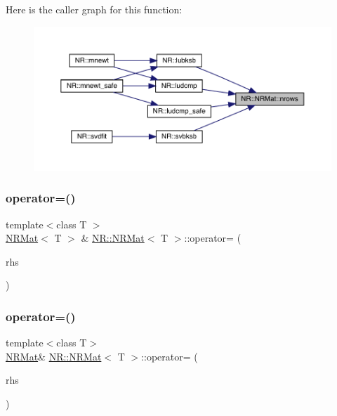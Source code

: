 Here is the caller graph for this function\+:
\nopagebreak
\begin{figure}[H]
\begin{center}
\leavevmode
\includegraphics[width=350pt]{da/d92/classNR_1_1NRMat_aacebd802ca3dea0e0079a8dd27f7102c_icgraph}
\end{center}
\end{figure}
\mbox{\label{classNR_1_1NRMat_a3cb82862ba2a5cff2516bd1c7ff517ef}} 
\subsubsection{\texorpdfstring{operator=()}{operator=()}\hspace{0.1cm}{\footnotesize\ttfamily [1/6]}}
{\footnotesize\ttfamily template$<$class T $>$ \\
\mbox{\hyperlink{classNR_1_1NRMat}{N\+R\+Mat}}$<$ T $>$ \& \mbox{\hyperlink{classNR_1_1NRMat}{N\+R\+::\+N\+R\+Mat}}$<$ T $>$\+::operator= (\begin{DoxyParamCaption}\item[{const \mbox{\hyperlink{classNR_1_1NRMat}{N\+R\+Mat}}$<$ T $>$ \&}]{rhs }\end{DoxyParamCaption})}

\mbox{\label{classNR_1_1NRMat_aba1c1ba10bf1b6ae9c2b78273e575dc4}} 
\subsubsection{\texorpdfstring{operator=()}{operator=()}\hspace{0.1cm}{\footnotesize\ttfamily [2/6]}}
{\footnotesize\ttfamily template$<$class T$>$ \\
\mbox{\hyperlink{classNR_1_1NRMat}{N\+R\+Mat}}\& \mbox{\hyperlink{classNR_1_1NRMat}{N\+R\+::\+N\+R\+Mat}}$<$ T $>$\+::operator= (\begin{DoxyParamCaption}\item[{const \mbox{\hyperlink{classNR_1_1NRMat}{N\+R\+Mat}}$<$ T $>$ \&}]{rhs }\end{DoxyParamCaption})}

